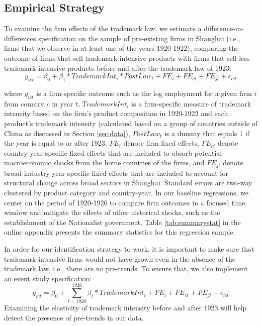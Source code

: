 \documentclass[12pt]{article}
\begin{document}
\subsection{Empirical Strategy}

To examine the firm effects of the trademark law, we estimate a difference-in-differences specification on the sample of pre-existing firms in Shanghai (i.e., firms that we observe in at least one of the years 1920-1922), comparing the outcome of firms that sell trademark-intensive products with firms that sell less trademark-intensive products before and after the trademark law of 1923:
\begin{equation} \label{eqn:firm_regression}
    y_{ict} = \beta_0 + \beta_1*TrademarkInt_{i}*PostLaw_t + FE_{i} + FE_{ct} + FE_{jt}  + \epsilon_{ict} 
\end{equation}

\noindent where $y_{ict}$ is a firm-specific outcome such as the log employment for a given firm $i$ from country $c$ in year $t$,  $TrademarkInt_{i}$ is a firm-specific measure of trademark intensity based on the firm's product composition in 1920-1922 and each product's trademark intensity (calculated based on a group of countries outside of China as discussed in Section \ref{sec:data}), $PostLaw_t$ is a dummy that equals 1 if the year is equal to or after 1923, $FE_{i}$ denote firm fixed effects, $FE_{ct}$ denote country-year specific fixed effects that are included to absorb potential macroeconomic shocks from the home countries of the  firms, and $FE_{jt}$ denote broad industry-year specific fixed effects that are included to account for structural change across broad sectors in Shanghai. Standard errors are two-way clustered by product category and country-year.  In our baseline regressions, we center on the period of 1920-1926 to compare firm outcomes in a focused time window and mitigate the effects of other historical shocks, such as the establishment of the Nationalist government. Table \ref{tab:summarystat} in the online appendix presents the summary statistics for this regression sample. 

In order for our identification strategy to work, it is important to make sure that  trademark-intensive firms would not have grown even in the absence of the trademark law, i.e., there are no pre-trends. To ensure that, we also implement an event study specification:
\begin{equation} \label{eqn:firm_eventstudy}
    y_{ict} = \beta_0 + \sum_{t=1920}^{1926} \beta_t*TrademarkInt_{i} + FE_{i}  + FE_{ct} + FE_{jt} + \epsilon_{ict} 
\end{equation}
Examining the elasticity of trademark intensity before and after 1923 will help detect the presence of  pre-trends in our data.
\end{document}
